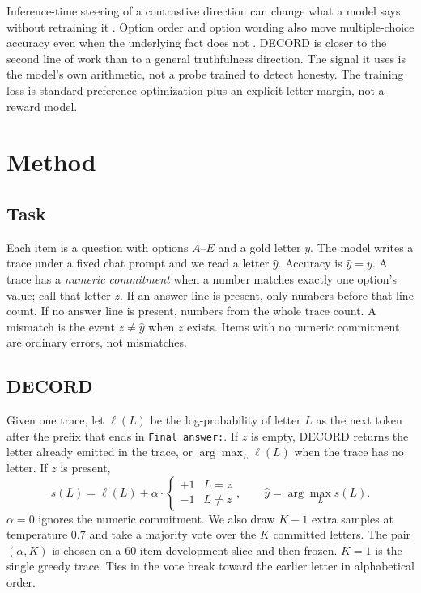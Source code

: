 \documentclass[11pt]{article}
\begin{document}
Inference-time steering of a contrastive direction can change what a model says without retraining it \citep{li2023iti}.
Option order and option wording also move multiple-choice accuracy even when the underlying fact does not \citep{zhao2021calibrate,zheng2024mcq}.
DECORD is closer to the second line of work than to a general truthfulness direction.
The signal it uses is the model's own arithmetic, not a probe trained to detect honesty.
The training loss is standard preference optimization \citep{rafailov2023dpo} plus an explicit letter margin, not a reward model.

\section{Method}

\subsection{Task}

Each item is a question with options \(A\)--\(E\) and a gold letter \(y\).
The model writes a trace under a fixed chat prompt and we read a letter \(\hat{y}\).
Accuracy is \(\hat{y}=y\).
A trace has a \emph{numeric commitment} when a number matches exactly one option's value; call that letter \(z\).
If an answer line is present, only numbers before that line count.
If no answer line is present, numbers from the whole trace count.
A mismatch is the event \(z\neq\hat{y}\) when \(z\) exists.
Items with no numeric commitment are ordinary errors, not mismatches.

\subsection{DECORD}

Given one trace, let \(\ell(L)\) be the log-probability of letter \(L\) as the next token after the prefix that ends in \texttt{Final answer:}.
If \(z\) is empty, DECORD returns the letter already emitted in the trace, or \(\arg\max_L \ell(L)\) when the trace has no letter.
If \(z\) is present,
\[
s(L)=\ell(L)+\alpha\cdot\begin{cases}+1 & L=z\\ -1 & L\neq z\end{cases},
\qquad
\hat{y}=\arg\max_L s(L).
\]
\(\alpha=0\) ignores the numeric commitment.
We also draw \(K-1\) extra samples at temperature \(0.7\) and take a majority vote over the \(K\) committed letters.
The pair \((\alpha,K)\) is chosen on a 60-item development slice and then frozen.
\(K=1\) is the single greedy trace.
Ties in the vote break toward the earlier letter in alphabetical order.
\end{document}
